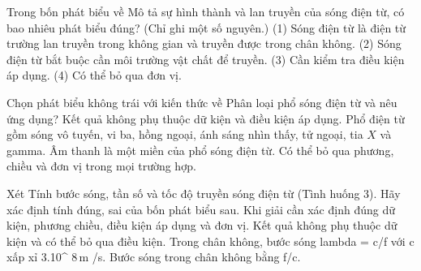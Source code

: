 \begin{ex}
Trong bốn phát biểu về Mô tả sự hình thành và lan truyền của sóng điện từ, có bao nhiêu phát biểu đúng? (Chỉ ghi một số nguyên.) (1) Sóng điện từ là điện từ trường lan truyền trong không gian và truyền được trong chân không. (2) Sóng điện từ bắt buộc cần môi trường vật chất để truyền. (3) Cần kiểm tra điều kiện áp dụng. (4) Có thể bỏ qua đơn vị.
\end{ex}

\begin{ex}
Chọn phát biểu không trái với kiến thức về Phân loại phổ sóng điện từ và nêu ứng dụng?
\choice
{Kết quả không phụ thuộc dữ kiện và điều kiện áp dụng.}
{\True Phổ điện từ gồm sóng vô tuyến, vi ba, hồng ngoại, ánh sáng nhìn thấy, tử ngoại, tia $X$ và gamma.}
{Âm thanh là một miền của phổ sóng điện từ.}
{Có thể bỏ qua phương, chiều và đơn vị trong mọi trường hợp.}
\end{ex}

\begin{ex}
Xét Tính bước sóng, tần số và tốc độ truyền sóng điện từ (Tình huống 3). Hãy xác định tính đúng, sai của bốn phát biểu sau.
\choiceTF
{\True Khi giải cần xác định đúng dữ kiện, phương chiều, điều kiện áp dụng và đơn vị.}
{Kết quả không phụ thuộc dữ kiện và có thể bỏ qua điều kiện.}
{\True Trong chân không, bước sóng lambda = c/f với c xấp xỉ 3.10^ $8\,\text{m}$ /s.}
{Bước sóng trong chân không bằng f/c.}
\end{ex}

